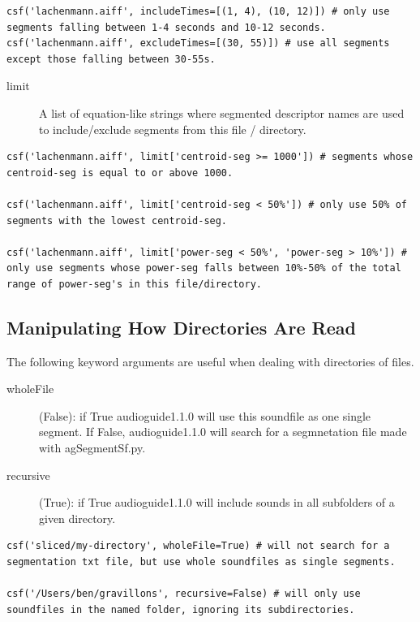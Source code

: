 \documentclass{article}
\newcommand{\ag}{audioguide1.1.0\xspace}
\begin{document}
\begin{spacing}{1.2}
\begin{lstlisting}
csf('lachenmann.aiff', includeTimes=[(1, 4), (10, 12)]) # only use segments falling between 1-4 seconds and 10-12 seconds.
csf('lachenmann.aiff', excludeTimes=[(30, 55)]) # use all segments except those falling between 30-55s.
\end{lstlisting}

\begin{description}
\item[limit] A list of equation-like strings where segmented descriptor names are used to include/exclude segments from this file / directory.
\end{description}
\begin{lstlisting}
csf('lachenmann.aiff', limit['centroid-seg >= 1000']) # segments whose centroid-seg is equal to or above 1000.

csf('lachenmann.aiff', limit['centroid-seg < 50%']) # only use 50% of segments with the lowest centroid-seg.

csf('lachenmann.aiff', limit['power-seg < 50%', 'power-seg > 10%']) # only use segments whose power-seg falls between 10%-50% of the total range of power-seg's in this file/directory.
\end{lstlisting}



\subsection{Manipulating How Directories Are Read}
The following keyword arguments are useful when dealing with directories of files.
\begin{description}
\item[wholeFile] (False): if True \ag will use this soundfile as one single segment.  If False, \ag will search for a segmnetation file made with agSegmentSf.py.

\item[recursive] (True): if True \ag will include sounds in all subfolders of a given directory.
\end{description}

\begin{lstlisting}
csf('sliced/my-directory', wholeFile=True) # will not search for a segmentation txt file, but use whole soundfiles as single segments.

csf('/Users/ben/gravillons', recursive=False) # will only use soundfiles in the named folder, ignoring its subdirectories.
\end{lstlisting}


\end{spacing}
\end{document}
